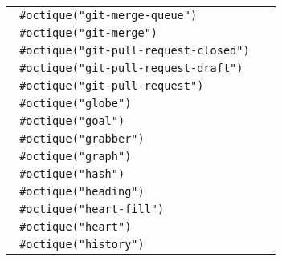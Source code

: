\begin{longtable}[]{@{}lc@{}}
\texttt{\ \#octique("git-merge-queue")\ } &
\pandocbounded{} \\
\texttt{\ \#octique("git-merge")\ } &
\pandocbounded{} \\
\texttt{\ \#octique("git-pull-request-closed")\ } &
\pandocbounded{} \\
\texttt{\ \#octique("git-pull-request-draft")\ } &
\pandocbounded{} \\
\texttt{\ \#octique("git-pull-request")\ } &
\pandocbounded{} \\
\texttt{\ \#octique("globe")\ } &
\pandocbounded{} \\
\texttt{\ \#octique("goal")\ } &
\pandocbounded{} \\
\texttt{\ \#octique("grabber")\ } &
\pandocbounded{} \\
\texttt{\ \#octique("graph")\ } &
\pandocbounded{} \\
\texttt{\ \#octique("hash")\ } &
\pandocbounded{} \\
\texttt{\ \#octique("heading")\ } &
\pandocbounded{} \\
\texttt{\ \#octique("heart-fill")\ } &
\pandocbounded{} \\
\texttt{\ \#octique("heart")\ } &
\pandocbounded{} \\
\texttt{\ \#octique("history")\ } &
\pandocbounded{} \\

\end{longtable}
